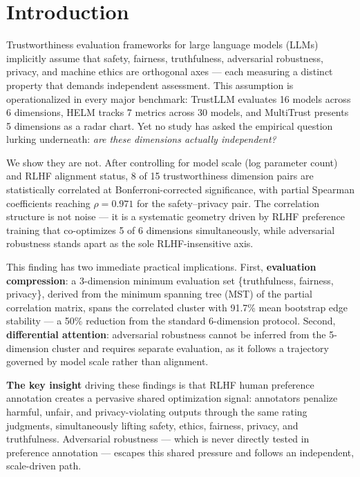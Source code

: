 \section{Introduction}

Trustworthiness evaluation frameworks for large language models (LLMs) implicitly assume that safety, fairness, truthfulness, adversarial robustness, privacy, and machine ethics are orthogonal axes --- each measuring a distinct property that demands independent assessment. This assumption is operationalized in every major benchmark: TrustLLM \cite{sun2024trustllm} evaluates 16 models across 6 dimensions, HELM \cite{liang2023helm} tracks 7 metrics across 30 models, and MultiTrust \cite{zhang2024multitrust} presents 5 dimensions as a radar chart. Yet no study has asked the empirical question lurking underneath: \emph{are these dimensions actually independent?}

We show they are not. After controlling for model scale (log parameter count) and RLHF alignment status, 8 of 15 trustworthiness dimension pairs are statistically correlated at Bonferroni-corrected significance, with partial Spearman coefficients reaching $\rho = 0.971$ for the safety--privacy pair. The correlation structure is not noise --- it is a systematic geometry driven by RLHF preference training that co-optimizes 5 of 6 dimensions simultaneously, while adversarial robustness stands apart as the sole RLHF-insensitive axis.

This finding has two immediate practical implications. First, \textbf{evaluation compression}: a 3-dimension minimum evaluation set \{truthfulness, fairness, privacy\}, derived from the minimum spanning tree (MST) of the partial correlation matrix, spans the correlated cluster with 91.7\% mean bootstrap edge stability --- a 50\% reduction from the standard 6-dimension protocol. Second, \textbf{differential attention}: adversarial robustness cannot be inferred from the 5-dimension cluster and requires separate evaluation, as it follows a trajectory governed by model scale rather than alignment.

\textbf{The key insight} driving these findings is that RLHF human preference annotation creates a pervasive shared optimization signal: annotators penalize harmful, unfair, and privacy-violating outputs through the same rating judgments, simultaneously lifting safety, ethics, fairness, privacy, and truthfulness. Adversarial robustness --- which is never directly tested in preference annotation --- escapes this shared pressure and follows an independent, scale-driven path.

